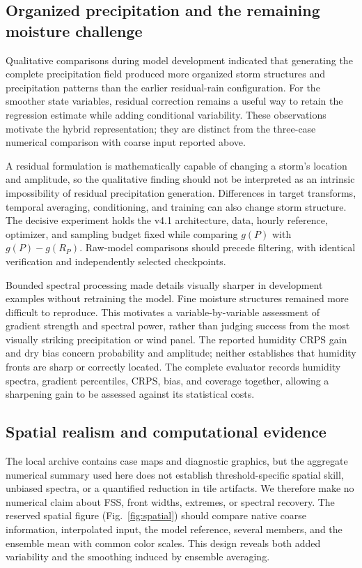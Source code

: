 \documentclass[10pt]{article}
\begin{document}
\subsection{Organized precipitation and the remaining moisture challenge}\label{sec:qualitative}
Qualitative comparisons during model development indicated that generating the complete precipitation field produced more organized storm structures and precipitation patterns than the earlier residual-rain configuration. For the smoother state variables, residual correction remains a useful way to retain the regression estimate while adding conditional variability. These observations motivate the hybrid representation; they are distinct from the three-case numerical comparison with coarse input reported above.

A residual formulation is mathematically capable of changing a storm's location and amplitude, so the qualitative finding should not be interpreted as an intrinsic impossibility of residual precipitation generation. Differences in target transforms, temporal averaging, conditioning, and training can also change storm structure. The decisive experiment holds the v4.1 architecture, data, hourly reference, optimizer, and sampling budget fixed while comparing $g(P)$ with $g(P)-g(R_P)$. Raw-model comparisons should precede filtering, with identical verification and independently selected checkpoints.

Bounded spectral processing made details visually sharper in development examples without retraining the model. Fine moisture structures remained more difficult to reproduce. This motivates a variable-by-variable assessment of gradient strength and spectral power, rather than judging success from the most visually striking precipitation or wind panel. The reported humidity CRPS gain and dry bias concern probability and amplitude; neither establishes that humidity fronts are sharp or correctly located. The complete evaluator records humidity spectra, gradient percentiles, CRPS, bias, and coverage together, allowing a sharpening gain to be assessed against its statistical costs.

\subsection{Spatial realism and computational evidence}
The local archive contains case maps and diagnostic graphics, but the aggregate numerical summary used here does not establish threshold-specific spatial skill, unbiased spectra, or a quantified reduction in tile artifacts. We therefore make no numerical claim about FSS, front widths, extremes, or spectral recovery. The reserved spatial figure (Fig.~\ref{fig:spatial}) should compare native coarse information, interpolated input, the model reference, several members, and the ensemble mean with common color scales. This design reveals both added variability and the smoothing induced by ensemble averaging.
\end{document}
